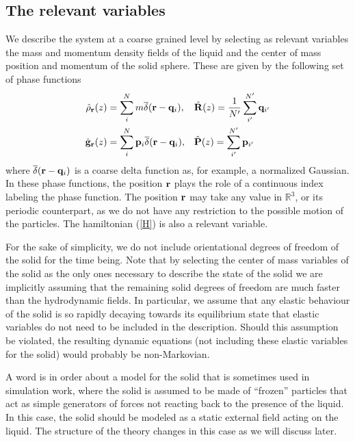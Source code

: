 \documentclass[b5paper,openright,11pt]{book}
\newcommand{\Pendiente}[1]{{\color{green}#1}} %
\begin{document}
\subsection{The relevant variables}
We describe the system at a coarse grained level by selecting as
relevant variables the  mass and momentum density fields  of the liquid
and  the   center  of  mass   position  and  momentum  of   the  solid
sphere. These are given by the following set of phase functions 
\begin{align}
  \hat{\rho}_{\bf r}(z) &=\sum^{N}_im\overline{\delta}({\bf r}-{\bf q}_i),
&&\hat{\bf R}(z)=\frac{1}{N'}\sum_{i'}^{N'}{\bf q}_{i'}
\nonumber\\
  \hat{\bf g}_{\bf r}(z) &=\sum^{N}_i{\bf p}_i\overline{\delta}({\bf r}-{\bf q}_i),
&&\hat{\bf P}(z)=\sum_{i'}^{N'}{\bf p}_{i'}
\label{CGvar}
\end{align}
where $\overline{\delta}({\bf r}-{\bf q}_i)$ is a coarse delta function as, for example, a normalized Gaussian.
In these phase  functions, the position ${\bf r}$ plays  the role of a
continuous index labeling  the phase function. The  position ${\bf r}$
may take any value in  $\mathbb{R}^3$, or its periodic counterpart, as
we  do  not  have  any  restriction to  the  possible  motion  of  the
particles. \Pendiente{The hamiltonian (\ref{H}) is also a relevant variable.}

For the sake of simplicity, we do not include orientational degrees of
freedom of the  solid for the time being.  Note  that by selecting the
center of  mass variables of the  solid as the only  ones necessary to
describe the  state of the solid  we are implicitly assuming  that the
remaining  solid  degrees   of  freedom  are  much   faster  than  the
hydrodynamic  fields.   In  particular,  we assume  that  any  elastic
behaviour of the solid is  so rapidly decaying towards its equilibrium
state  that elastic  variables  do  not need  to  be  included in  the
description. Should this assumption be violated, the resulting dynamic
equations (not including  these elastic variables for the solid)
would probably  be non-Markovian.

A word is in order about a  model for the solid that is sometimes used
in  simulation work,  where the  solid  is  assumed to  be made  of
``frozen''  particles that  act  as simple  generators  of forces  not
reacting back  to the presence of  the liquid. In this  case, the solid
should be modeled as a static external field acting on the liquid. The
structure of the theory changes in this case as we will discuss later.
\end{document}
